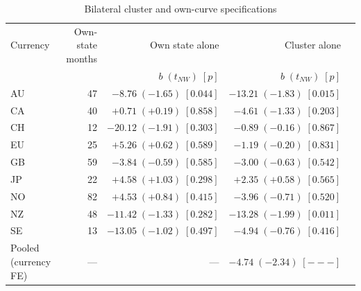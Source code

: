 \begin{table}[H]
\centering
\caption{Bilateral cluster and own-curve specifications}
\label{tab:v03-bilateral-own-curve}
\scriptsize
\setlength{\tabcolsep}{3pt}
\begin{tabular}{lrrrr}
\toprule
Currency & Own-state months & Own state alone & Cluster alone \\
& & $b\;(t_{NW})\;[p]$ & $b\;(t_{NW})\;[p]$ \\
\midrule
AU & 47 & $-8.76\;(-1.65)\;[0.044]$ & $-13.21\;(-1.83)\;[0.015]$ \\
CA & 40 & $+0.71\;(+0.19)\;[0.858]$ & $-4.61\;(-1.33)\;[0.203]$ \\
CH & 12 & $-20.12\;(-1.91)\;[0.303]$ & $-0.89\;(-0.16)\;[0.867]$ \\
EU & 25 & $+5.26\;(+0.62)\;[0.589]$ & $-1.19\;(-0.20)\;[0.831]$ \\
GB & 59 & $-3.84\;(-0.59)\;[0.585]$ & $-3.00\;(-0.63)\;[0.542]$ \\
JP & 22 & $+4.58\;(+1.03)\;[0.298]$ & $+2.35\;(+0.58)\;[0.565]$ \\
NO & 82 & $+4.53\;(+0.84)\;[0.415]$ & $-3.96\;(-0.71)\;[0.520]$ \\
NZ & 48 & $-11.42\;(-1.33)\;[0.282]$ & $-13.28\;(-1.99)\;[0.011]$ \\
SE & 13 & $-13.05\;(-1.02)\;[0.497]$ & $-4.94\;(-0.76)\;[0.416]$ \\
Pooled (currency FE) & --- & --- & $-4.74\;(-2.34)\;[---]$ \\
\bottomrule
\end{tabular}


\end{table}
